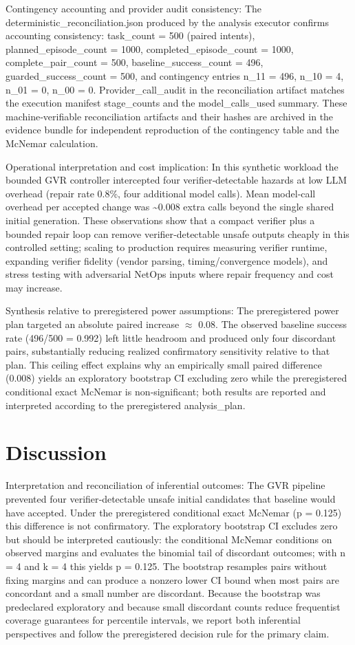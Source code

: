 \documentclass[conference]{IEEEtran}
\begin{document}
Contingency accounting and provider audit consistency: The deterministic\_reconciliation.json produced by the analysis executor confirms accounting consistency: task\_count = 500 (paired intents), planned\_episode\_count = 1000, completed\_episode\_count = 1000, complete\_pair\_count = 500, baseline\_success\_count = 496, guarded\_success\_count = 500, and contingency entries n\_11 = 496, n\_10 = 4, n\_01 = 0, n\_00 = 0. Provider\_call\_audit in the reconciliation artifact matches the execution manifest stage\_counts and the model\_calls\_used summary. These machine‑verifiable reconciliation artifacts and their hashes are archived in the evidence bundle for independent reproduction of the contingency table and the McNemar calculation.

Operational interpretation and cost implication: In this synthetic workload the bounded GVR controller intercepted four verifier‑detectable hazards at low LLM overhead (repair rate 0.8\%, four additional model calls). Mean model‑call overhead per accepted change was \textasciitilde{}0.008 extra calls beyond the single shared initial generation. These observations show that a compact verifier plus a bounded repair loop can remove verifier‑detectable unsafe outputs cheaply in this controlled setting; scaling to production requires measuring verifier runtime, expanding verifier fidelity (vendor parsing, timing/convergence models), and stress testing with adversarial NetOps inputs where repair frequency and cost may increase.

Synthesis relative to preregistered power assumptions: The preregistered power plan targeted an absolute paired increase \ensuremath{\approx} 0.08. The observed baseline success rate (496/500 = 0.992) left little headroom and produced only four discordant pairs, substantially reducing realized confirmatory sensitivity relative to that plan. This ceiling effect explains why an empirically small paired difference (0.008) yields an exploratory bootstrap CI excluding zero while the preregistered conditional exact McNemar is non‑significant; both results are reported and interpreted according to the preregistered analysis\_plan.

\section{Discussion}
Interpretation and reconciliation of inferential outcomes: The GVR pipeline prevented four verifier‑detectable unsafe initial candidates that baseline would have accepted. Under the preregistered conditional exact McNemar (p = 0.125) this difference is not confirmatory. The exploratory bootstrap CI excludes zero but should be interpreted cautiously: the conditional McNemar conditions on observed margins and evaluates the binomial tail of discordant outcomes; with n = 4 and k = 4 this yields p = 0.125. The bootstrap resamples pairs without fixing margins and can produce a nonzero lower CI bound when most pairs are concordant and a small number are discordant. Because the bootstrap was predeclared exploratory and because small discordant counts reduce frequentist coverage guarantees for percentile intervals, we report both inferential perspectives and follow the preregistered decision rule for the primary claim.
\end{document}
